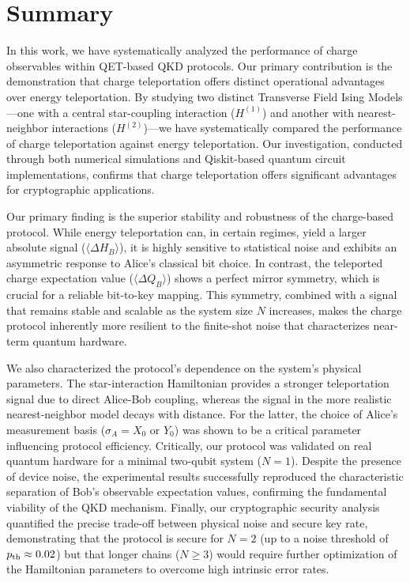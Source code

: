\section{Summary}
\label{sec:summary}

In this work, we have systematically analyzed the performance of charge observables within QET-based QKD protocols. Our primary contribution is the demonstration that charge teleportation offers distinct operational advantages over energy teleportation. By studying two distinct Transverse Field Ising Models—one with a central star-coupling interaction ($H^{(1)}$) and another with nearest-neighbor interactions ($H^{(2)}$)—we have systematically compared the performance of charge teleportation against energy teleportation. Our investigation, conducted through both numerical simulations and Qiskit-based quantum circuit implementations, confirms that charge teleportation offers significant advantages for cryptographic applications.

Our primary finding is the superior stability and robustness of the charge-based protocol. While energy teleportation can, in certain regimes, yield a larger absolute signal ($\langle \Delta H_B \rangle$), it is highly sensitive to statistical noise and exhibits an asymmetric response to Alice's classical bit choice. In contrast, the teleported charge expectation value ($\langle \Delta Q_B \rangle$) shows a perfect mirror symmetry, which is crucial for a reliable bit-to-key mapping. This symmetry, combined with a signal that remains stable and scalable as the system size $N$ increases, makes the charge protocol inherently more resilient to the finite-shot noise that characterizes near-term quantum hardware.

We also characterized the protocol's dependence on the system's physical parameters. The star-interaction Hamiltonian provides a stronger teleportation signal due to direct Alice-Bob coupling, whereas the signal in the more realistic nearest-neighbor model decays with distance. For the latter, the choice of Alice's measurement basis ($\sigma_A = X_0$ or $Y_0$) was shown to be a critical parameter influencing protocol efficiency. Critically, our protocol was validated on real quantum hardware for a minimal two-qubit system ($N=1$). Despite the presence of device noise, the experimental results successfully reproduced the characteristic separation of Bob's observable expectation values, confirming the fundamental viability of the QKD mechanism. Finally, our cryptographic security analysis quantified the precise trade-off between physical noise and secure key rate, demonstrating that the protocol is secure for $N=2$ (up to a noise threshold of $p_{\rm th} \approx 0.02$) but that longer chains ($N \ge 3$) would require further optimization of the Hamiltonian parameters to overcome high intrinsic error rates.

